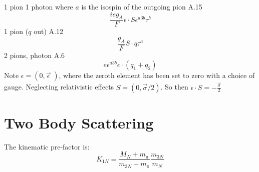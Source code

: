 \documentclass[11pt]{article}
\newcommand{\mpi}{\ensuremath{m_\pi}}
\newcommand{\ga}{\ensuremath{g_A}}
\begin{document}
1 pion 1 photon where $a$ is the isospin of the outgoing pion A.15
\begin{equation}
	\frac{i e \ga}{F} \epsilon \cdot S \epsilon^{a3b} \tau^b
\end{equation}
1 pion ($q$ out) A.12
\begin{equation}
	\frac{\ga}{F} S \cdot q \tau^a
\end{equation}
2 pions, photon A.6
\begin{equation}
	e \epsilon^{a3b} \epsilon \cdot \left( q_1 +q_2 \right)
\end{equation}
Note $\epsilon=(0,\vec{ \epsilon}\;)$, where the zeroth element has
been set to zero with a choice of gauge.
Neglecting relativistic effects $S=(0, \vec{\sigma}/2)$.
So then
$\epsilon \cdot S =-\frac{\vec{\sigma}}{2} $
\section{Two Body Scattering}
The kinematic pre-factor is:
\begin{equation}
	K_{1N}= \frac{M_N +\mpi}{m_{3N}+\mpi} \frac{m_{3N}}{m_N}
\end{equation}
\end{document}
